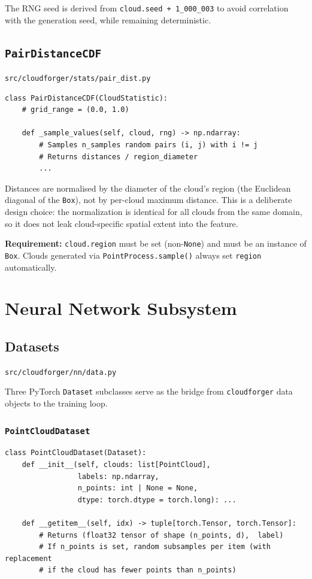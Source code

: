 \documentclass[11pt, a4paper]{article}
\newcommand{\code}[1]{\texttt{#1}}
\newcommand{\pyfile}[1]{\texttt{\small #1}}
\newcommand{\typename}[1]{\textbf{\texttt{#1}}}
\begin{document}
The RNG seed is derived from \code{cloud.seed + 1\_000\_003} to avoid
correlation with the generation seed, while remaining deterministic.

\subsection{\typename{PairDistanceCDF}}
\pyfile{src/cloudforger/stats/pair\_dist.py}

\begin{lstlisting}
class PairDistanceCDF(CloudStatistic):
    # grid_range = (0.0, 1.0)

    def _sample_values(self, cloud, rng) -> np.ndarray:
        # Samples n_samples random pairs (i, j) with i != j
        # Returns distances / region_diameter
        ...
\end{lstlisting}

Distances are normalised by the diameter of the cloud's region
(the Euclidean diagonal of the \code{Box}), not by per-cloud maximum
distance.
This is a deliberate design choice: the normalization is identical for
all clouds from the same domain, so it does not leak cloud-specific
spatial extent into the feature.

\textbf{Requirement:} \code{cloud.region} must be set (non-\code{None})
and must be an instance of \code{Box}. Clouds generated via
\code{PointProcess.sample()} always set \code{region} automatically.

\section{Neural Network Subsystem}
\label{sec:nn}

\subsection{Datasets}
\pyfile{src/cloudforger/nn/data.py}

Three PyTorch \code{Dataset} subclasses serve as the bridge from
\code{cloudforger} data objects to the training loop.

\subsubsection{\typename{PointCloudDataset}}

\begin{lstlisting}
class PointCloudDataset(Dataset):
    def __init__(self, clouds: list[PointCloud],
                 labels: np.ndarray,
                 n_points: int | None = None,
                 dtype: torch.dtype = torch.long): ...

    def __getitem__(self, idx) -> tuple[torch.Tensor, torch.Tensor]:
        # Returns (float32 tensor of shape (n_points, d),  label)
        # If n_points is set, random subsamples per item (with replacement
        # if the cloud has fewer points than n_points)
\end{lstlisting}
\end{document}
